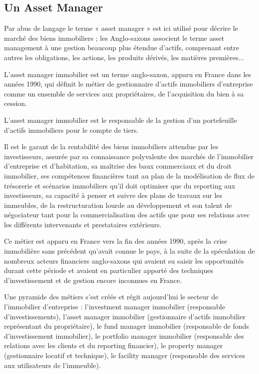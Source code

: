 \subsection{Un Asset Manager}

\par Par abus de langage le terme « asset manager » est ici utilisé pour décrire le marché des biens immobiliers ; les Anglo-saxons associent le terme asset management à une gestion beaucoup plus étendue d'actifs, comprenant entre autres les obligations, les actions, les produits dérivés, les matières premières...
\par L’asset manager immobilier est un terme anglo-saxon, apparu en France dans les années 1990, qui définit le métier de gestionnaire d'actifs immobiliers d'entreprise comme un ensemble de services aux propriétaires, de l'acquisition du bien à sa cession.
\par L’asset manager immobilier est le responsable de la gestion d'un portefeuille d'actifs immobiliers pour le compte de tiers.
\par Il est le garant de la rentabilité des biens immobiliers attendue par les investisseurs, assurée par sa connaissance polyvalente des marchés de l'immobilier d'entreprise et d'habitation, sa maîtrise des baux commerciaux et du droit immobilier, ses compétences financières tant au plan de la modélisation de flux de trésorerie et scénarios immobiliers qu'il doit optimiser que du reporting aux investisseurs, sa capacité à penser et suivre des plans de travaux sur les immeubles, de la restructuration lourde au développement et son talent de négociateur tant pour la commercialisation des actifs que pour ses relations avec les différents intervenants et prestataires extérieurs.
\par Ce métier est apparu en France vers la fin des années 1990, après la crise immobilière sans précédent qu'avait connue le pays, à la suite de la spéculation de nombreux acteurs financiers anglo-saxons qui avaient su saisir les opportunités durant cette période et avaient en particulier apporté des techniques d'investissement et de gestion encore inconnues en France.
\par Une pyramide des métiers s'est créée et régit aujourd'hui le secteur de l'immobilier d'entreprise : l’investment manager immobilier (responsable d'investissements), l’asset manager immobilier (gestionnaire d'actifs immobilier représentant du propriétaire), le fund manager immobilier (responsable de fonds d'investissement immobilier), le portfolio manager immobilier (responsable des relations avec les clients et du reporting financier), le property manager (gestionnaire locatif et technique), le facility manager (responsable des services aux utilisateurs de l'immeuble).
